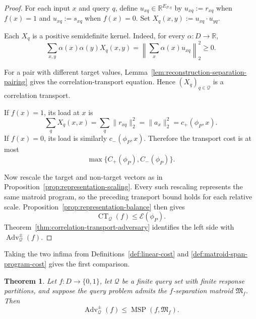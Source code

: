 \documentclass[11pt]{article}
\numberwithin{equation}{section}
\newtheorem{theorem}[definition]{Theorem}
\theoremstyle{remark}
\begin{document}
\begin{proof}
For each input $x$ and query $q$, define
$u_{xq}\in\mathbb R^{E_{P,q}}$ by
$u_{xq}:=r_{xq}$ when $f(x)=1$ and
$u_{xq}:=s_{xq}$ when $f(x)=0$. Set
$X_q(x,y):=u_{xq}\mathbin{\cdot}u_{yq}$.

Each $X_q$ is a positive semidefinite kernel. Indeed, for every
$\alpha:D\to\mathbb R$,
\begin{equation}
    \sum_{x,y}
        \alpha(x)\alpha(y)X_q(x,y)
    =
    \left\|
        \sum_x\alpha(x)u_{xq}
    \right\|_2^2
    \geq0.
\end{equation}

For a pair with different target values,
Lemma~\ref{lem:reconstruction-separation-pairing} gives the
correlation-transport equation. Hence $(X_q)_{q\in\mathcal Q}$ is a
correlation transport.

If $f(x)=1$, its load at $x$ is
\begin{equation}
    \sum_qX_q(x,x)
    =
    \sum_q\|r_{xq}\|_2^2
    =
    \|a_x\|_2^2
    =
    c_+(\phi_P,x).
\end{equation}
If $f(x)=0$, its load is similarly $c_-(\phi_P,x)$. Therefore the
transport cost is at most
\begin{equation}
    \max\{C_+(\phi_P),C_-(\phi_P)\}.
\end{equation}

Now rescale the target and non-target vectors as in
Proposition~\ref{prop:representation-scaling}. Every such rescaling
represents the same matroid program, so the preceding transport bound holds
for each relative scale. Proposition~\ref{prop:representation-balance}
then gives
\begin{equation}
    \operatorname{CT}_{\mathcal Q}(f)
    \leq
    \mathcal E(\phi_P).
\end{equation}
Theorem~\ref{thm:correlation-transport-adversary} identifies the left side
with $\operatorname{Adv}^{\pm}_{\mathcal Q}(f)$.
\end{proof}

Taking the two infima from
Definitions~\ref{def:linear-cost} and
\ref{def:matroid-span-program-cost} gives the first comparison.

\begin{theorem}
\label{thm:adversary-lower-bounds-msp}
Let $f:D\to\{0,1\}$, let $\mathcal Q$ be a finite query set with finite
response partitions, and suppose the query problem admits the
$f$-separation matroid $\mathfrak M_f$. Then
\begin{equation}
    \operatorname{Adv}^{\pm}_{\mathcal Q}(f)
    \leq
    \operatorname{MSP}(f,\mathfrak M_f).
\end{equation}
\end{theorem}
\end{document}
